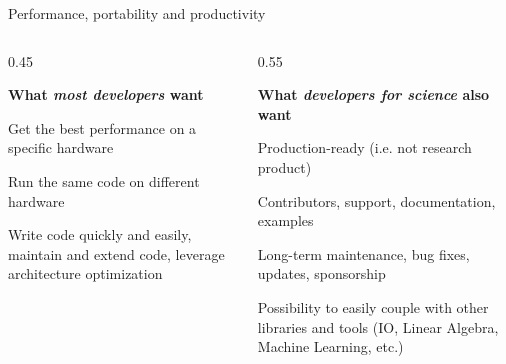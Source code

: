 \documentclass[
    aspectratio=169,
    \createHandout
]{beamer}
\begin{document}
\begin{frame}{Performance, portability and productivity}
    \begin{columns}[T]
        \begin{column}{0.45\linewidth}
            \begin{center}
            \textbf{What \emph{most developers} want}
            \end{center}
            \begin{description}[Performance]
                \item[Performance] Get the best performance on a specific hardware
                \item[Portability] Run the same code on different hardware
                \item[Productivity] Write code quickly and easily, maintain and extend code, leverage architecture optimization
            \end{description}
        \end{column}
        \pause
        \begin{column}{0.55\linewidth}
            \begin{center}
                \textbf{What \emph{developers for science} also want}
            \end{center}
            \begin{description}[Interporability]
                \item[Maturity] Production-ready (i.e. not research product)
                \item[Community] Contributors, support, documentation, examples
                \item[Longevity] Long-term maintenance, bug fixes, updates, sponsorship
                \item[Interporability] Possibility to easily couple with other libraries and tools (IO, Linear Algebra, Machine Learning, etc.)
            \end{description}
        \end{column}
    \end{columns}
\end{frame}

\end{document}
